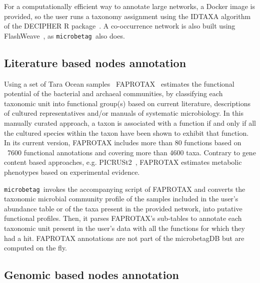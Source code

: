 \documentclass[sn-mathphys,Numbered]{sn-jnl}  %
\theoremstyle{thmstyleone}%
\theoremstyle{thmstyletwo}%
\theoremstyle{thmstylethree}%
\newcommand{\microbetag}{\texttt{microbetag }}
\begin{document}
        For a computationally efficient way to annotate large networks, a Docker image is provided, so the user runs a taxonomy assignment using the IDTAXA algorithm~\cite{murali2018idtaxa} of the DECIPHER R package~\cite{wright2016using}.
        A co-occurrence network is also built using FlashWeave~\cite{flashweave_cite}, as \microbetag also does.


    \subsection*{Literature based nodes annotation}
    \label{subsec:fapro}

        Using a set of Tara Ocean samples~\cite{sunagawa2015structure} FAPROTAX~\cite{louca2016decoupling} estimates the functional potential of the bacterial and archaeal communities, by classifying each taxonomic unit into functional group(s) based on current literature, descriptions of cultured representatives and/or manuals of systematic microbiology. 
        In this manually curated approach, a taxon is associated with a function if and only if all the cultured species within the taxon have been shown to exhibit that function. 
        In its current version, FAPROTAX includes more than 80 functions based on ~7600 functional annotations and covering more than 4600 taxa.
        Contrary to gene content based approaches, e.g. PICRUSt2~\cite{douglas2020picrust2}, FAPROTAX  estimates metabolic phenotypes based on experimental evidence. 

        \microbetag invokes the accompanying script of FAPROTAX and converts the taxonomic microbial community profile of the samples included in the user's abundance table or of the taxa present in the provided network, into putative functional profiles.
        Then, it parses FAPROTAX's sub-tables to annotate each taxonomic unit present in the user's data with all the functions for which they had a hit. 
        FAPROTAX annotations are not part of the microbetagDB but are computed on the fly.


    \subsection*{Genomic based nodes annotation}
    \label{subsec:phen}
\end{document}
